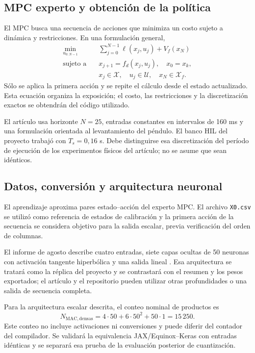 \subsection{MPC experto y obtención de la política}
El MPC busca una secuencia de acciones que minimiza un costo sujeto a dinámica y restricciones. En una formulación general,
\begin{equation}
\begin{aligned}
\min_{u_{0:N-1}}\quad &\sum_{j=0}^{N-1}\ell(x_j,u_j)+V_f(x_N)\\
\text{sujeto a}\quad &x_{j+1}=f_d(x_j,u_j),\quad x_0=x_k,\\
&x_j\in\mathcal X,\quad u_j\in\mathcal U,\quad x_N\in\mathcal X_f.
\end{aligned}
\end{equation}
Sólo se aplica la primera acción y se repite el cálculo desde el estado actualizado. Esta ecuación organiza la exposición; el costo, las restricciones y la discretización exactos se obtendrán del código utilizado.

El artículo usa horizonte $N=25$, entradas constantes en intervalos de 160 ms y una formulación orientada al levantamiento del péndulo. El banco HIL del proyecto trabajó con $T_s=0,16$ s. Debe distinguirse esa discretización del período de ejecución de los experimentos físicos del artículo; no se asume que sean idénticos.

\subsection{Datos, conversión y arquitectura neuronal}
El aprendizaje aproxima pares estado--acción del experto MPC. El archivo \texttt{X0.csv} se utilizó como referencia de estados de calibración y la primera acción de la secuencia se considera objetivo para la salida escalar, previa verificación del orden de columnas.

El informe de agosto describe cuatro entradas, siete capas ocultas de 50 neuronas con activación tangente hiperbólica y una salida lineal \cite{avance2026}. Esa arquitectura se tratará como la réplica del proyecto y se contrastará con el resumen y los pesos exportados; el artículo y el repositorio pueden utilizar otras profundidades o una salida de secuencia completa.

Para la arquitectura escalar descrita, el conteo nominal de productos es
\begin{equation}N_{\mathrm{MAC,densas}}=4\cdot50+6\cdot50^2+50\cdot1=15\,250.\end{equation}
Este conteo no incluye activaciones ni conversiones y puede diferir del contador del compilador. Se validará la equivalencia JAX/Equinox--Keras con entradas idénticas y se separará esa prueba de la evaluación posterior de cuantización.

